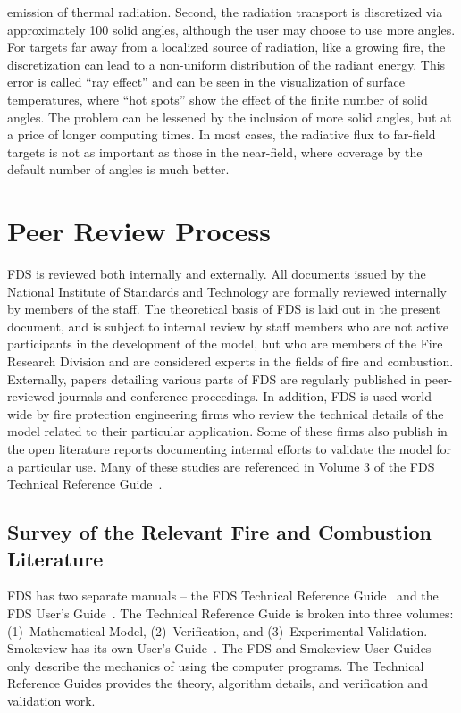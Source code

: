 \documentclass[11pt]{book}
\begin{document}
\begin{description}
emission of thermal radiation.  Second, the radiation transport is
discretized via approximately 100 solid angles, although the user may
choose to use more angles. For targets far away from a localized
source of radiation, like a growing fire, the discretization can lead
to a non-uniform distribution of the radiant energy. This error is
called ``ray effect'' and can be seen in the visualization of surface
temperatures, where ``hot spots'' show the effect of the finite number
of solid angles. The problem can be lessened by the inclusion of more
solid angles, but at a price of longer computing times. In most cases,
the radiative flux to far-field targets is not as important as those
in the near-field, where coverage by the default number of angles is
much better.
\end{description}



\clearpage
\section{Peer Review Process}

FDS is reviewed both internally and externally. All documents issued by the
National Institute of Standards and Technology are formally reviewed internally by members of
the staff. The theoretical basis of FDS is laid out in the present document, and is
subject to internal review by staff members who are not active participants in the development
of the model, but who are members of the Fire Research Division and are considered experts in
the fields of fire and combustion. Externally, papers detailing various parts of FDS are
regularly published in peer-reviewed journals and conference proceedings. In addition, FDS
is used world-wide by fire protection engineering firms who review the technical details of
the model related to their particular application. Some of these firms also publish in the
open literature reports documenting internal efforts to validate the model for a particular
use. Many of these studies are referenced in Volume 3 of the FDS Technical Reference Guide~\cite{FDS_Tech_Guide_5}.


\subsection{Survey of the Relevant Fire and Combustion Literature}

\label{Relevantdocs}

FDS has two separate manuals --
the FDS Technical Reference Guide~\cite{FDS_Tech_Guide_5}
and the FDS User's Guide~\cite{FDS_Users_Guide_5}. The Technical Reference Guide is broken into three volumes: (1)~Mathematical Model, (2)~Verification, and (3)~Experimental Validation.
Smokeview has its own User's Guide~\cite{Smokeview_Users_Guide_5}. The FDS and Smokeview User Guides only describe the mechanics of using the
computer programs. The
Technical Reference Guides provides the theory, algorithm details, and verification and validation work.
\end{document}
